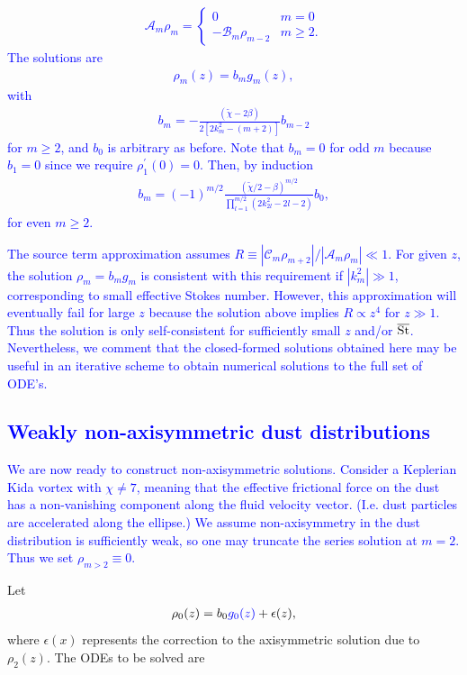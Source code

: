 \documentclass[apj]{emulateapj}
\def\blue#1{\textcolor{blue}{#1}}
\newcommand{\tilchi}{\tilde\chi}
\newcommand{\St}{{\rm St}}
\begin{document}
\blue{
\begin{align}
\mathcal{A}_m\rho_m = \begin{cases}
        0 & m =0 \\
	-\mathcal{B}_m\rho_{m-2} & m \geq 2.
\end{cases}
\end{align}
The solutions are 
\begin{align}\label{eq:series1}
\rho_m (z)= b_m g_m(z),
\end{align}
with
\begin{align}
b_m  = -\frac{\left(\tilchi - 2\beta\right)}{2\left[2k_m^2 - (m+2)\right]}b_{m-2}
\end{align}
for $m\geq2$, and $b_0$ is arbitrary as before. Note that $b_m=0$ for odd $m$ because $b_1=0$ since 
we require $\rho_1^\prime(0)=0$. Then, by induction 
\begin{align}\label{eq:induction}
b_m  = \left(-1\right)^{m/2}\frac{\left(\tilchi/2-\beta\right)^{m/2}}{\prod_{l=1}^{m/2}
\left(2k_{2l}^2 -2l - 2\right)}b_0,
\end{align}
for even $m\geq 2$.  
}

\blue{
The source term approximation assumes 
$R\equiv|\mathcal{C}_m\rho_{m+2}|/|\mathcal{A}_m\rho_m| \ll 1.$ 
For given $z$, the solution $\rho_m=b_mg_m$ is consistent with this requirement if $|k_m^2|\gg1$, corresponding to small effective Stokes number.  
 However, this approximation will eventually fail for large $z$ because the solution above implies $R\propto z^4$ for $z\gg1$. Thus the solution is only self-consistent for sufficiently small $z$ and/or $\overline{\St}$. Nevertheless,
we comment that the closed-formed solutions obtained here may be useful in
an iterative scheme to obtain numerical solutions to the full set of ODE's. 
}

\blue{
\subsection{Weakly non-axisymmetric dust distributions}
We are now ready to construct non-axisymmetric solutions. 
Consider a Keplerian Kida vortex with $\chi\neq 7$, meaning that the effective 
frictional force on the dust has a non-vanishing component along the
fluid velocity vector. (I.e. dust particles are accelerated along the
ellipse.) We assume non-axisymmetry in the dust distribution is
sufficiently weak, so one may truncate the series solution at
$m=2$. Thus we set $\rho_{m>2}\equiv0$.} Let
\begin{align}
\rho_0(z) = b_0\blue{g_0(z)} + \epsilon(z),
\end{align}
where $\epsilon(x)$ represents the correction to the axisymmetric
solution due to $\rho_2(z)$. The ODEs to be solved are
\end{document}
